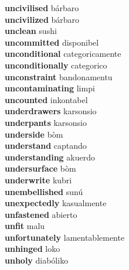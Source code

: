 \textbf{uncivilised } bárbaro \\
\textbf{uncivilized } bárbaro \\
\textbf{unclean } sushi \\
\textbf{uncommitted } disponibel \\
\textbf{unconditional } categoricamente \\
\textbf{unconditionally } categorico \\
\textbf{unconstraint } bandonamentu \\
\textbf{uncontaminating } limpi \\
\textbf{uncounted } inkontabel \\
\textbf{underdrawers } karsonsio \\
\textbf{underpants } karsonsio \\
\textbf{underside } bòm \\
\textbf{understand } captando \\
\textbf{understanding } akuerdo \\
\textbf{undersurface } bòm \\
\textbf{underwrite } kubri \\
\textbf{unembellished } sunú \\
\textbf{unexpectedly } kasualmente \\
\textbf{unfastened } abierto \\
\textbf{unfit } malu \\
\textbf{unfortunately } lamentablemente \\
\textbf{unhinged } loko \\
\textbf{unholy } diabóliko \\
